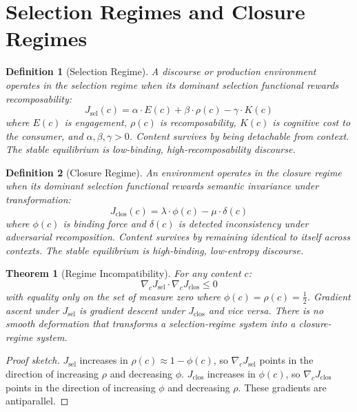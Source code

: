 \documentclass[12pt]{article}
\newtheorem{theorem}{Theorem}[section]
\newtheorem{definition}{Definition}[section]
\newcommand{\bind}{\phi}
\newcommand{\recomp}{\rho}
\newcommand{\Jsel}{J_{\mathrm{sel}}}
\newcommand{\Jclos}{J_{\mathrm{clos}}}
\begin{document}
\section{Selection Regimes and Closure Regimes}
\label{sec:regimes}

\begin{definition}[Selection Regime]
\label{def:selreg}
A discourse or production environment operates in the \emph{selection
regime} when its dominant selection functional rewards recomposability:
\[
\Jsel(c) = \alpha \cdot E(c) + \beta \cdot \recomp(c) - \gamma \cdot K(c)
\]
where $E(c)$ is engagement, $\recomp(c)$ is recomposability, $K(c)$ is
cognitive cost to the consumer, and $\alpha, \beta, \gamma > 0$. Content
survives by being detachable from context. The stable equilibrium is
low-binding, high-recomposability discourse.
\end{definition}

\begin{definition}[Closure Regime]
\label{def:closreg}
An environment operates in the \emph{closure regime} when its dominant
selection functional rewards semantic invariance under transformation:
\[
\Jclos(c) = \lambda \cdot \bind(c) - \mu \cdot \delta(c)
\]
where $\bind(c)$ is binding force and $\delta(c)$ is detected
inconsistency under adversarial recomposition. Content survives by
remaining identical to itself across contexts. The stable equilibrium is
high-binding, low-entropy discourse.
\end{definition}

\begin{theorem}[Regime Incompatibility]
\label{thm:incompatibility}
For any content $c$:
\[
\nabla_c \Jsel \cdot \nabla_c \Jclos \leq 0
\]
with equality only on the set of measure zero where
$\bind(c) = \recomp(c) = \tfrac{1}{2}$. Gradient ascent under $\Jsel$
is gradient descent under $\Jclos$ and vice versa. There is no smooth
deformation that transforms a selection-regime system into a
closure-regime system.
\end{theorem}

\begin{proof}[Proof sketch]
$\Jsel$ increases in $\recomp(c) \approx 1 - \bind(c)$, so
$\nabla_c \Jsel$ points in the direction of increasing $\recomp$ and
decreasing $\bind$. $\Jclos$ increases in $\bind(c)$, so $\nabla_c
\Jclos$ points in the direction of increasing $\bind$ and decreasing
$\recomp$. These gradients are antiparallel.
\end{proof}
\end{document}
